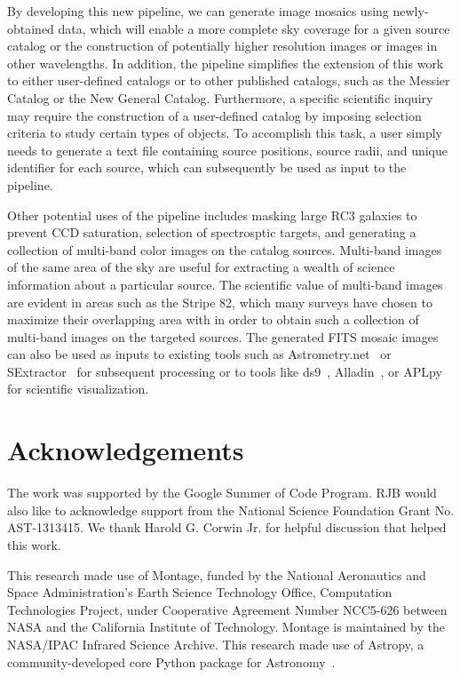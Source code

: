 \documentclass[authoryear, 12pt, 5p, times]{elsarticle}
\begin{document}
By developing this new pipeline, we can generate image mosaics using newly-obtained data, which will enable a more complete sky coverage for a given source catalog or the construction of potentially higher resolution images or images in other wavelengths. In addition, the pipeline simplifies the extension of this work to either user-defined catalogs or to other published catalogs, such as the Messier Catalog or the New General Catalog. Furthermore, a specific scientific inquiry may require the construction of a user-defined catalog  by imposing selection criteria to study certain types of objects. To accomplish this task, a user simply needs to generate a text file containing source positions, source radii, and unique identifier for each source, which can subsequently be used as input to the pipeline. 

Other potential uses of the pipeline includes masking large RC3 galaxies to prevent CCD saturation, selection of spectrosptic targets, and generating a collection of  multi-band color images on the catalog sources. Multi-band images of the same area of the sky are useful for extracting a wealth of science information about a particular source. The scientific value of multi-band images are evident in areas such as the Stripe 82, which many  surveys have chosen to maximize their overlapping area with in order to obtain such a collection of multi-band images on the targeted sources. The generated FITS mosaic images can also be used as inputs to existing tools such as Astrometry.net~\citep{astrometry.net} or SExtractor~\citep{sextractor} for subsequent processing or to tools like ds9~\citep{ds9}, Alladin~\citep{aladin}, or APLpy~\citep{aplpy} for scientific visualization.
\section*{Acknowledgements}
\footnotesize

The work was supported by the Google Summer of Code Program. RJB would also like to acknowledge support from the National Science Foundation Grant No. AST-1313415. We thank Harold G. Corwin Jr. for helpful discussion that helped this work. 

This research made use of Montage, funded by the National Aeronautics and Space Administration's Earth Science Technology Office, Computation Technologies Project, under Cooperative Agreement Number NCC5-626 between NASA and the California Institute of Technology. Montage is maintained by the NASA/IPAC Infrared Science Archive. This research made use of Astropy, a community-developed core Python package for Astronomy~\citep{astropy}.
\end{document}

